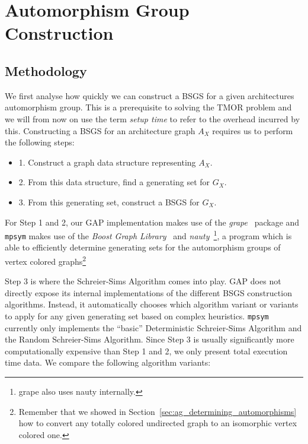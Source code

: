 \section{Automorphism Group Construction}
\label{sec:exp_automorphism_group_construction}

\subsection{Methodology}

We first analyse how quickly we can construct a BSGS for a given architectures
automorphism group. This is a prerequisite to solving the TMOR
problem and we will from now on use the term \textit{setup time} to refer to
the overhead incurred by this. Constructing a BSGS for an architecture
graph $A_X$ requires us to perform the following steps:
%
\begin{itemize}
\item 1. Construct a graph data structure representing $A_X$.
\item 2. From this data structure, find a generating set for $G_X$.
\item 3. From this generating set, construct a BSGS for $G_X$.
\end{itemize}
%
For Step 1 and 2, our GAP implementation makes use of the
\textit{grape}~\cite{grape} package and \texttt{mpsym} makes use of the
\textit{Boost Graph Library}~\cite{BGL} and
\textit{nauty}~\cite{nauty}\footnote{grape also uses nauty internally.}, a
program which is able to efficiently determine generating sets for the
automorphism groups of vertex colored graphs\footnote{Remember that we showed
in Section~\ref{sec:ag_determining_automorphisms} how to convert any totally
colored undirected graph to an isomorphic vertex colored one.}

Step 3 is where the Schreier-Sims Algorithm comes into play. GAP does not
directly expose its internal implementations of the different BSGS construction
algorithms. Instead, it automatically chooses which algorithm variant or
variants to apply for any given generating set based on complex heuristics.
\texttt{mpsym} currently only implements the ``basic'' Deterministic
Schreier-Sims Algorithm and the Random Schreier-Sims Algorithm. Since Step 3
is usually significantly more computationally expensive than Step 1 and 2, we
only present total execution time data.  We compare the following algorithm
variants:

